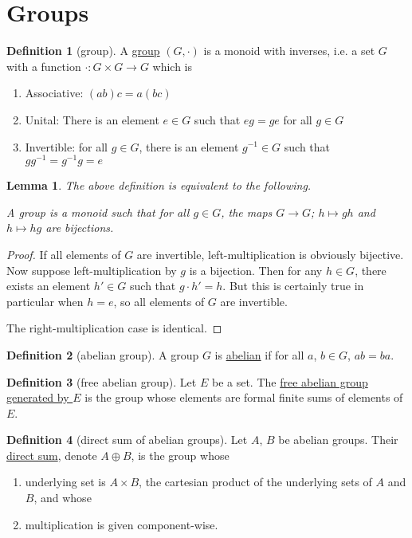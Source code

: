 \documentclass[a4paper,10pt]{scrreprt}
\newcommand{\defn}[1]{\ul{#1}}
\theoremstyle{definition}
\newtheorem{definition}{Definition}[section]
\theoremstyle{plain}
\newtheorem{lemma}{Lemma}[section]
\theoremstyle{remark}
\begin{document}
\section{Groups}
\begin{definition}[group]
  \label{def:group}
  A \defn{group} $(G, \cdot)$ is a monoid with inverses, i.e. a set $G$ with a function $\cdot\colon G \times G \to G$ which is
  \begin{enumerate}
    \item Associative: $(ab)c = a(bc)$
    \item Unital: There is an element $e \in G$ such that $eg = ge$ for all $g \in G$
    \item Invertible: for all $g \in G$, there is an element $g^{-1} \in G$ such that $gg^{-1} = g^{-1}g = e$
  \end{enumerate}
\end{definition}

\begin{lemma}
  The above definition is equivalent to the following. 

  A group is a monoid such that for all $g \in G$, the maps $G \to G$; $h \mapsto gh$ and $h \mapsto hg$ are bijections.
\end{lemma}
\begin{proof}
  If all elements of $G$ are invertible, left-multiplication is obviously bijective. Now suppose left-multiplication by $g$ is a bijection. Then for any $h \in G$, there exists an element $h' \in G$ such that $g \cdot h' = h$. But this is certainly true in particular when $h = e$, so all elements of $G$ are invertible.

  The right-multiplication case is identical.
\end{proof}

\begin{definition}[abelian group]
  \label{def:abeliangroup}
  A group $G$ is \defn{abelian} if for all $a$, $b \in G$, $ab=ba$.
\end{definition}

\begin{definition}[free abelian group]
  \label{def:freeabeliangroup}
  Let $E$ be a set. The \defn{free abelian group generated by $E$} is the group whose elements are formal finite sums of elements of $E$.
\end{definition}

\begin{definition}[direct sum of abelian groups]
  \label{def:directsumofabeliangroup}
  Let $A$, $B$ be abelian groups. Their \defn{direct sum}, denote $A \oplus B$, is the group whose
  \begin{enumerate}
    \item underlying set is $A \times B$, the cartesian product of the underlying sets of $A$ and $B$, and whose

    \item multiplication is given component-wise.
  \end{enumerate}
\end{definition}
\end{document}
